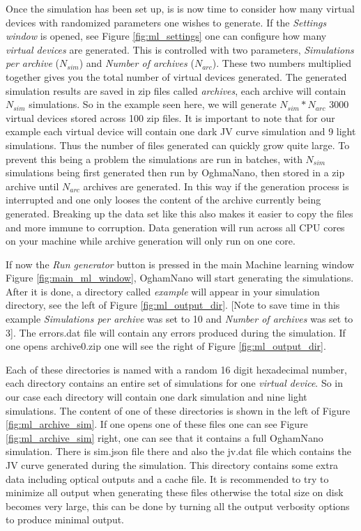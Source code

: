 Once the simulation has been set up, is is now time to consider how many virtual devices with randomized parameters one wishes to generate. If the \emph{Settings window} is opened, see Figure \ref{fig:ml_settings} one can configure how many \emph{virtual devices} are generated. This is controlled with two parameters, \emph{Simulations per archive} ($N_{sim}$) and \emph{Number of archives} ($N_{arc}$). These two numbers multiplied together gives you the total number of virtual devices generated. The generated simulation results are saved in zip files called \emph{archives}, each archive will contain $N_{sim}$ simulations. So in the example seen here, we will generate $N_{sim}*N_{arc}$ 3000 virtual devices stored across 100 zip files. It is important to note that for our example each virtual device will contain one dark JV curve simulation and 9 light simulations. Thus the number of files generated can quickly grow quite large. To prevent this being a problem the simulations are run in batches, with $N_{sim}$ simulations being first generated then run by OghmaNano, then stored in a zip archive until $N_{arc}$ archives are generated. In this way if the generation process is interrupted and one only looses the content of the archive currently being generated. Breaking up the data set like this also makes it easier to copy the files and more immune to corruption. Data generation will run across all CPU cores on your machine while archive generation will only run on one core.

If now the \emph{Run generator} button is pressed in the main Machine learning window Figure \ref{fig:main_ml_window}, OghamNano will start generating the simulations. After it is done, a directory called \emph{example} will appear in your simulation directory, see the left of Figure \ref{fig:ml_output_dir}. [Note to save time in this example \emph{Simulations per archive} was set to 10 and \emph{Number of archives} was set to 3]. The errors.dat file will contain any errors produced during the simulation. If one opens archive0.zip one will see the right of Figure \ref{fig:ml_output_dir}.

Each of these directories is named with a random 16 digit hexadecimal number, each directory contains an entire set of simulations for one \emph{virtual device}. So in our case each directory will contain one dark simulation and nine light simulations. The content of one of these directories is shown in the left of Figure \ref{fig:ml_archive_sim}. If one opens one of these files one can see Figure \ref{fig:ml_archive_sim} right, one can see that it contains a full OghamNano simulation. There is sim.json file there and also the jv.dat file which contains the JV curve generated during the simulation. This directory contains some extra data including optical outputs and a cache file. It is recommended to try to minimize all output when generating these files otherwise the total size on disk becomes very large, this can be done by turning all the output verbosity options to produce minimal output. 

